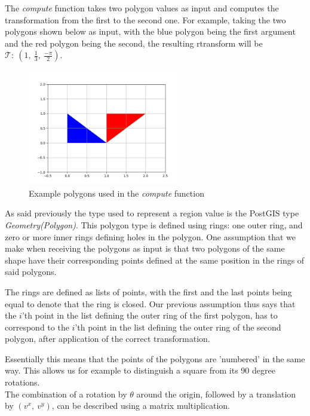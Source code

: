 The \textit{compute} function takes two polygon values as input and computes the transformation from the first to the second one. For example, taking the two polygons shown below as input, with the blue polygon being the first argument and the red polygon being the second, the resulting rtransform will be $\mathcal{T}:\ (1,\ \frac{1}{3},\ \frac{-\pi}{2})$.

\begin{figure}[h!]
    \centering
    \includegraphics[width=0.6\textwidth]{images/example_simple_transformation.png}
    \caption{Example polygons used in the \textit{compute} function}
    \label{fig:example_compute}
\end{figure}


As said previously the type used to represent a region value is the PostGIS type \textit{Geometry(Polygon)}. This polygon type is defined using rings: one outer ring, and zero or more inner rings defining holes in the polygon. One assumption that we make when receiving the polygons as input is that two polygons of the same shape have their corresponding points defined at the same position in the rings of said polygons. 

The rings are defined as lists of points, with the first and the last points being equal to denote that the ring is closed. Our previous assumption thus says that the $i$'th point in the list defining the outer ring of the first polygon, has to correspond to the $i$'th point in the list defining the outer ring of the second polygon, after application of the correct transformation.

Essentially this means that the points of the polygons are 'numbered' in the same way. This allows us for example to distinguish a square from its 90 degree rotations. \\

The combination of a rotation by $\theta$ around the origin, followed by a translation by $(v^x,\ v^y)$, can be described using a matrix multiplication.


